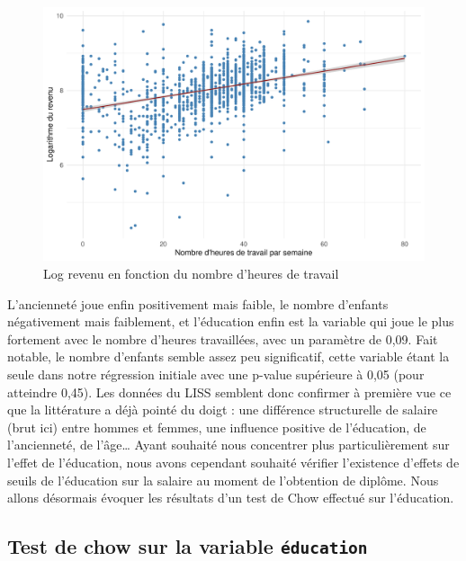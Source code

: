 \documentclass[a4paper, french, 11 pt]{article}\usepackage[]{graphicx}\usepackage[]{xcolor}
\makeatletter
\newenvironment{kframe}{%
 \def\at@end@of@kframe{}%
 \ifinner\ifhmode%
  \def\at@end@of@kframe{\end{minipage}}%
  \begin{minipage}{\columnwidth}%
 \fi\fi%
 \def\FrameCommand##1{\hskip\@totalleftmargin \hskip-\fboxsep
 \colorbox{shadecolor}{##1}\hskip-\fboxsep
     \hskip-\linewidth \hskip-\@totalleftmargin \hskip\columnwidth}%
 \MakeFramed {\advance\hsize-\width
   \@totalleftmargin\z@ \linewidth\hsize
   \@setminipage}}%
 {\par\unskip\endMakeFramed%
 \at@end@of@kframe}
\newenvironment{knitrout}{}{} %
\makeatother
\begin{document}
\begin{knitrout}
\color{fgcolor}\begin{kframe}


{\ttfamily\noindent\itshape{}}\end{kframe}
\end{knitrout}

\begin{figure}[h]
\center
\includegraphics[width=0.7\linewidth]{figure/heures_logrevenu.pdf}
\caption{Log revenu en fonction du nombre d'heures de travail\label{fig:heureslogrevenu}}
\end{figure}

L’ancienneté joue enfin positivement mais faible, le nombre d’enfants négativement mais faiblement, et l’éducation enfin est la variable qui joue le plus fortement avec le nombre d’heures travaillées, avec un paramètre de 0,09. Fait notable, le nombre d’enfants semble assez peu significatif, cette variable étant la seule dans notre régression initiale avec une p-value supérieure à 0,05 (pour atteindre 0,45).
        Les données du LISS semblent donc confirmer à première vue ce que la littérature a déjà pointé du doigt : une différence structurelle de salaire (brut ici) entre hommes et femmes, une influence positive de l’éducation, de l’ancienneté, de l’âge… Ayant souhaité nous concentrer plus particulièrement sur l’effet de l’éducation, nous avons cependant souhaité vérifier l’existence d'effets de seuils de l’éducation sur la salaire au moment de l’obtention de diplôme. Nous allons désormais évoquer les résultats d’un test de Chow effectué sur l’éducation. 

\subsection{Test de chow sur la variable \texttt{éducation}}
\end{document}
